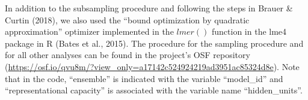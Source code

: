 \documentclass[
  ,man,floatsintext]{apa6}
\begin{document}
In addition to the subsampling procedure and following the steps in Brauer \& Curtin (2018), we also used the ``bound optimization by quadratic approximation'' optimizer implemented in the \(lmer()\) function in the lme4 package in R (Bates et al., 2015). The procedure for the sampling procedure and for all other analyses can be found in the project's OSF repository (\url{https://osf.io/qvu8m/?view_only=a17142c524924219ad3951ac85324d8e}). Note that in the code, ``ensemble'' is indicated with the variable ``model\_id'' and ``representational capacity'' is associated with the variable name ``hidden\_units''.


\clearpage
\renewcommand{\listtablename}{Table captions}
\end{document}
